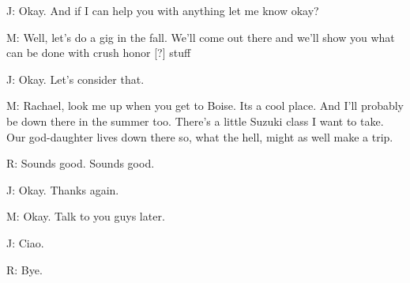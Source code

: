 \documentclass[11pt]{article}
\begin{document}
J: Okay. And if I can help you with anything let me know okay?

M: Well, let's do a gig in the fall. We'll come out there and we'll show you what can be done with crush honor [?] stuff 

J: Okay. Let's consider that. 

M: Rachael, look me up when you get to Boise. Its a cool place. And I'll probably be down there in the summer too. There's a little Suzuki class I want to take. Our god-daughter lives down there so, what the hell, might as well make a trip.

R: Sounds good. Sounds good.

J: Okay. Thanks again. 

M: Okay. Talk to you guys later.

J: Ciao. 

R: Bye.   
\end{document}

